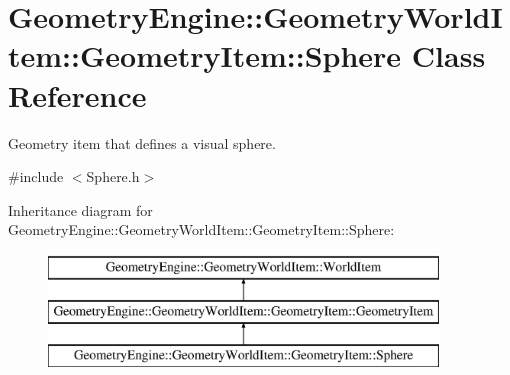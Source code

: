 \hypertarget{class_geometry_engine_1_1_geometry_world_item_1_1_geometry_item_1_1_sphere}{}\section{Geometry\+Engine\+::Geometry\+World\+Item\+::Geometry\+Item\+::Sphere Class Reference}
\label{class_geometry_engine_1_1_geometry_world_item_1_1_geometry_item_1_1_sphere}


Geometry item that defines a visual sphere.  




{\ttfamily \#include $<$Sphere.\+h$>$}

Inheritance diagram for Geometry\+Engine\+::Geometry\+World\+Item\+::Geometry\+Item\+::Sphere\+:\begin{figure}[H]
\begin{center}
\leavevmode
\includegraphics[height=3.000000cm]{class_geometry_engine_1_1_geometry_world_item_1_1_geometry_item_1_1_sphere}
\end{center}
\end{figure}
